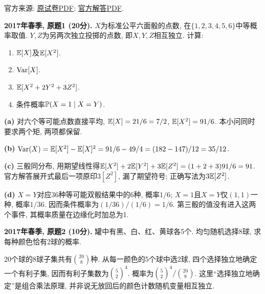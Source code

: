 \noindent 官方来源: \href{https://ocw.mit.edu/courses/18-600-probability-and-random-variables-fall-2019/25bb4897aed3cc4112d685e4dfbb9a7d_MIT18_600F19_mid1_2017.pdf}{原试卷PDF}; \href{https://ocw.mit.edu/courses/18-600-probability-and-random-variables-fall-2019/87a8eb5f64734f2b436ac96d15cfe6bf_MIT18_600F19_mid1_2017_soln.pdf}{官方解答PDF}.
\begin{exercise}\label{ex:m1-2017s-q1}
\textbf{2017年春季, 原题1 (20分).} $X$为标准公平六面骰的点数, 在$\{1,2,3,4,5,6\}$中等概率取值. $Y,Z$为另两次独立投掷的点数, 即$X,Y,Z$相互独立. 计算:
\begin{enumerate}\item[(a)]\label{ex:m1-2017s-q1-a} $\mathbb E[X]$及$\mathbb E[X^2]$.\item[(b)]\label{ex:m1-2017s-q1-b} $\operatorname{Var}[X]$.\item[(c)]\label{ex:m1-2017s-q1-c} $\mathbb E[X^2+2Y^2+3Z^2]$.\item[(d)]\label{ex:m1-2017s-q1-d} 条件概率$\mathbb P(X=1\mid X=Y)$.\end{enumerate}
\end{exercise}
\begin{solution}
\textbf{(a)}\label{sol:m1-2017s-q1-a} 对六个等可能点数直接平均, $\mathbb E[X]=21/6=7/2$, $\mathbb E[X^2]=91/6$. 本小问同时要求两个矩, 两项都保留.

\textbf{(b)}\label{sol:m1-2017s-q1-b} $\operatorname{Var}(X)=\mathbb E[X^2]-\mathbb E[X]^2=91/6-49/4=(182-147)/12=35/12$.

\textbf{(c)}\label{sol:m1-2017s-q1-c} 三骰同分布, 用期望线性得$\mathbb E[X^2]+2\mathbb E[Y^2]+3\mathbb E[Z^2]=(1+2+3)91/6=91$. 官方解答展开式最后一项原印$3[Z^2]$, 漏了期望符号; 正确写法为$3\mathbb E[Z^2]$.

\textbf{(d)}\label{sol:m1-2017s-q1-d} $X=Y$对应$36$种等可能双骰结果中的$6$种, 概率$1/6$; $X=1$且$X=Y$仅$(1,1)$一种, 概率$1/36$. 因而条件概率为$(1/36)/(1/6)=1/6$. 第三骰的值没有进入这两个事件, 其概率质量在边缘化时加总为1.
\end{solution}

\begin{exercise}\label{ex:m1-2017s-q2}
\textbf{2017年春季, 原题2 (10分).} 罐中有黑、白、红、黄球各5个. 均匀随机选择8球, 求每种颜色恰有2球的概率.
\end{exercise}
\begin{solution}
\label{sol:m1-2017s-q2}
20个球的8球子集共有$\binom{20}{8}$种. 从每一颜色的5个球中选2球, 四个选择独立地确定一个有利子集, 因而有利子集数为$\binom52^4$. 概率为$\binom52^4/\binom{20}{8}$. 这里“选择独立地确定”是组合乘法原理, 并非说无放回后的颜色计数随机变量相互独立.
\end{solution}

